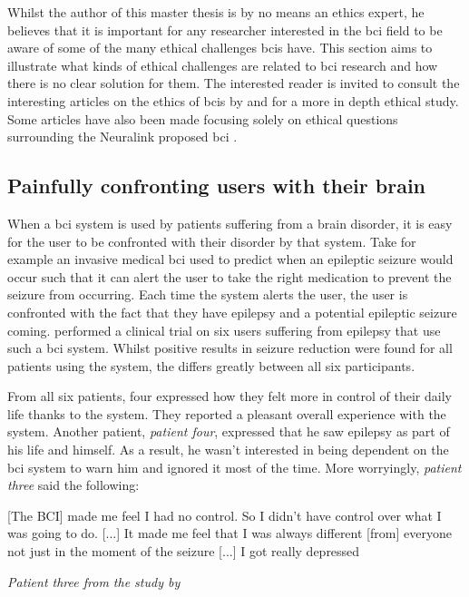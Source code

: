 Whilst the author of this master thesis is by no means an ethics expert, he believes that it is important for any researcher interested in the \gls{bci} field to be aware of some of the many ethical challenges \glspl{bci} have.
This section aims to illustrate what kinds of ethical challenges are related to \gls{bci} research and how there is no clear solution for them.
The interested reader is invited to consult the interesting articles on the ethics of \glspl{bci} by \citet{ethics_of_bci} and \citet{ethical_dillemas} for a more in depth ethical study.
Some articles have also been made focusing solely on ethical questions surrounding the Neuralink proposed \gls{bci} \citep{neuralink_ethics,neuralink_ethics2}.


\subsection{Painfully confronting users with their brain}
\label{subsec:bci_ethical_confronting}

When a \gls{bci} system is used by patients suffering from a brain disorder, it is easy for the user to be confronted with their disorder by that system.
Take for example an invasive medical \gls{bci} used to predict when an epileptic seizure would occur such that it can alert the user to take the right medication to prevent the seizure from occurring.
Each time the system alerts the user, the user is confronted with the fact that they have epilepsy and a potential epileptic seizure coming.
 performed a clinical trial on six users suffering from epilepsy that use such a \gls{bci} system.
Whilst positive results in seizure reduction were found for all patients using the system, the  differs greatly between all six participants.

From all six patients, four expressed how they felt more in control of their daily life thanks to the system.
They reported a pleasant overall experience with the system.
Another patient, \textit{patient four}, expressed that he saw epilepsy as part of his life and himself.
As a result, he wasn't interested in being dependent on the \gls{bci} system to warn him and ignored it most of the time.
More worryingly, \textit{patient three} said the following: 

\setlength{\epigraphwidth}{0.9\textwidth}
\epigraph{[The BCI] made me feel I had no control. So I didn't have control over what I was going to do. [...]  It made me feel that I was always different [from] everyone not just in the moment of the seizure [...] I got really depressed}{\textit{Patient three from the study by \citet{first_bci_trial}}}

